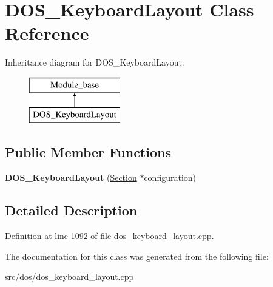 \hypertarget{classDOS__KeyboardLayout}{\section{D\-O\-S\-\_\-\-Keyboard\-Layout Class Reference}
\label{classDOS__KeyboardLayout}
}
Inheritance diagram for D\-O\-S\-\_\-\-Keyboard\-Layout\-:\begin{figure}[H]
\begin{center}
\leavevmode
\includegraphics[height=2.000000cm]{classDOS__KeyboardLayout}
\end{center}
\end{figure}
\subsection*{Public Member Functions}
\begin{DoxyCompactItemize}
\item 
\hypertarget{classDOS__KeyboardLayout_a794faca95d191a599d107822832a037d}{{\bfseries D\-O\-S\-\_\-\-Keyboard\-Layout} (\hyperlink{classSection}{Section} $\ast$configuration)}\label{classDOS__KeyboardLayout_a794faca95d191a599d107822832a037d}

\end{DoxyCompactItemize}


\subsection{Detailed Description}


Definition at line 1092 of file dos\-\_\-keyboard\-\_\-layout.\-cpp.



The documentation for this class was generated from the following file\-:\begin{DoxyCompactItemize}
\item 
src/dos/dos\-\_\-keyboard\-\_\-layout.\-cpp\end{DoxyCompactItemize}

